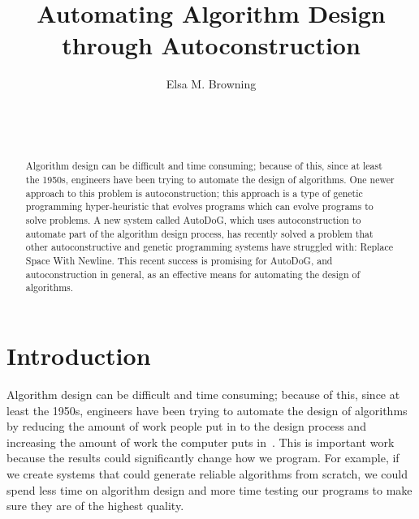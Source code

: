 \documentclass{sig-alternate}
\begin{document}

\title{Automating Algorithm Design through Autoconstruction}


\author{
\alignauthor
Elsa M. Browning\\
	\\
	\\
	\\
}

\maketitle
\begin{abstract}
	Algorithm design can be difficult and time consuming; because of this, since at least the 1950s, engineers have been trying to automate the design of algorithms. One newer approach to this problem is autoconstruction; this approach is a type of genetic programming hyper-heuristic that evolves programs which can evolve programs to solve problems. A new system called AutoDoG, which uses autoconstruction to automate part of the algorithm design process, has recently solved a problem that other autoconstructive and genetic programming systems have struggled with: Replace Space With Newline. This recent success is promising for AutoDoG, and autoconstruction in general, as an effective means for automating the design of algorithms.
\end{abstract}


\section{Introduction}
\label{sec:introduction}
Algorithm design can be difficult and time consuming; because of this, since at least the 1950s, engineers have been trying to automate the design of algorithms by reducing the amount of work people put in to the design process and increasing the amount of work the computer puts in~\cite{pappa:2014}. This is important work because the results could significantly change how we program. For example, if we create systems that could generate reliable algorithms from scratch, we could spend less time on algorithm design and more time testing our programs to make sure they are of the highest quality.
\end{document}
